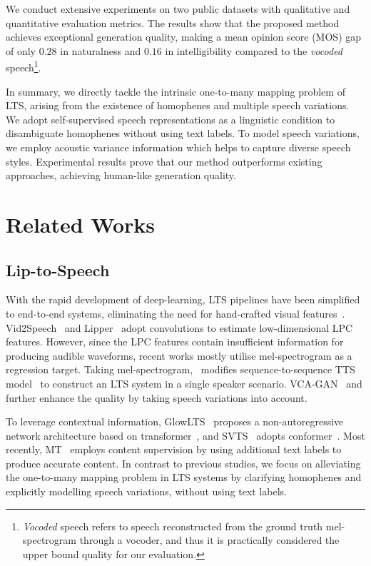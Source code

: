 \documentclass[letterpaper]{article} %
\begin{document}
We conduct extensive experiments on two public datasets with qualitative and quantitative evaluation metrics. The results show that the proposed method achieves exceptional generation quality, making a mean opinion score (MOS) gap of only $\mathbf{0.28}$ in naturalness and $\mathbf{0.16}$ in intelligibility compared to the \textit{vocoded} speech\footnote{\textit{Vocoded} speech refers to speech reconstructed from the ground truth mel-spectrogram through a vocoder, and thus it is practically considered the upper bound quality for our evaluation.}.

In summary, we directly tackle the intrinsic one-to-many mapping problem of LTS, arising from the existence of homophenes and multiple speech variations.
We adopt self-supervised speech representations as a linguistic condition to disambiguate homophenes without using text labels. 
To model speech variations, we employ acoustic variance information which helps to capture diverse speech styles. 
Experimental results prove that our method outperforms existing approaches, achieving human-like generation quality.


\section{Related Works}

\subsection{Lip-to-Speech} 
With the rapid development of deep-learning, LTS pipelines have been simplified to end-to-end systems, eliminating the need for hand-crafted visual features~\cite{le2015reconstructing,le2017generating}. Vid2Speech~\cite{ephrat2017vid2speech} and Lipper~\cite{kumar2019lipper} adopt convolutions to estimate low-dimensional LPC features. However, since the LPC features contain insufficient information for producing audible waveforms, recent works mostly utilise mel-spectrogram as a regression target. Taking mel-spectrogram,~\cite{prajwal2020learning} modifies sequence-to-sequence TTS model~\cite{shen2018natural} to construct an LTS system in a single speaker scenario. VCA-GAN~\cite{kim2021lip} and \cite{yadav2021speech} further enhance the quality by taking speech variations into account.

To leverage contextual information, GlowLTS~\cite{he2022flow} proposes a non-autoregressive network architecture based on transformer~\cite{vaswani2017attention}, and SVTS~\cite{mira2022svts} adopts conformer~\cite{gulati2020conformer}.
Most recently, MT~\cite{kim2023lip} employs content supervision by using additional text labels to produce accurate content. 
In contrast to previous studies, we focus on alleviating the one-to-many mapping problem in LTS systems by clarifying homophenes and explicitly modelling speech variations, without using text labels.
\end{document}
